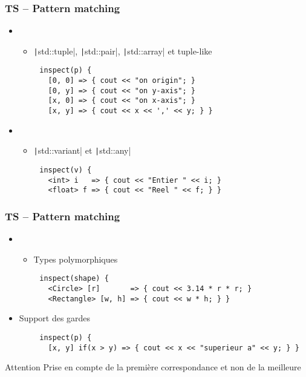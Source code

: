 \documentclass[C++.tex]{subfiles}
\begin{document}
\begin{frame}[fragile]
	\frametitle{TS -- Pattern matching}
	\begin{itemize}
		\item[] 
		\begin{itemize}
			\item \texttt|std::tuple|, \texttt|std::pair|, \texttt|std::array| et tuple-like
		\end{itemize}
	\end{itemize}

	\begin{verbatim}
		inspect(p) {
		  [0, 0] => { cout << "on origin"; }
		  [0, y] => { cout << "on y-axis"; }
		  [x, 0] => { cout << "on x-axis"; }
		  [x, y] => { cout << x << ',' << y; } }
	\end{verbatim}

	\begin{itemize}
		\item [] 
		\begin{itemize}
			\item \texttt|std::variant| et \texttt|std::any|
		\end{itemize}
	\end{itemize}

	\begin{verbatim}
		inspect(v) {
		  <int> i   => { cout << "Entier " << i; }
		  <float> f => { cout << "Reel " << f; } }
	\end{verbatim}
\end{frame}

\begin{frame}[fragile]
	\frametitle{TS -- Pattern matching}
	\begin{itemize}
		\item[] 
		\begin{itemize}
			\item Types polymorphiques
		\end{itemize}
	\end{itemize}

	\begin{verbatim}
		inspect(shape) {
		  <Circle> [r]       => { cout << 3.14 * r * r; }
		  <Rectangle> [w, h] => { cout << w * h; } }
	\end{verbatim}

	\begin{itemize}
		\item Support des gardes
	\end{itemize}

	\begin{verbatim}
		inspect(p) {
		  [x, y] if(x > y) => { cout << x << "superieur a" << y; } }
	\end{verbatim}

	\begin{alertblock}{Attention}
		Prise en compte de la première correspondance et non de la meilleure
	\end{alertblock}
\end{frame}
\end{document}
